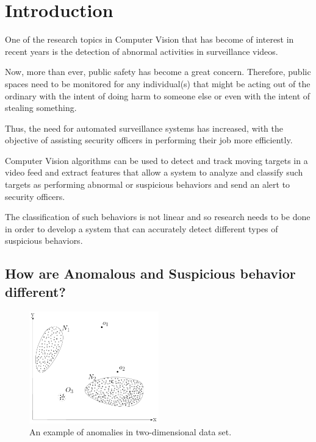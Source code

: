 \chapter{Introduction}\label{ch:introduction}

One of the research topics in Computer Vision that has become of interest in recent years is the detection of abnormal activities in surveillance videos. 

Now, more than ever, public safety has become a great concern. Therefore, public spaces need to be monitored for any individual(s) that might be acting out of the ordinary with the intent of doing harm to someone else or even with the intent of stealing something.

Thus, the need for automated surveillance systems has increased, with the objective of assisting security officers in performing their job more efficiently.

Computer Vision algorithms can be used to detect and track moving targets in a video feed and extract features that allow a system to analyze and classify such targets as performing abnormal or suspicious behaviors and send an alert to security officers.

The classification of such behaviors is not linear and so research needs to be done in order to develop a system that can accurately detect different types of suspicious behaviors.

\section{How are Anomalous and Suspicious behavior different?}

\begin{figure}
  \centering
  \includegraphics[width=0.5\textwidth]{figures/Anomalies_in_2D_data.png}
  \caption{An example of anomalies in two-dimensional data set\cite{n23}.}
  \label{fig:AnomaliesExample1}
\end{figure}

